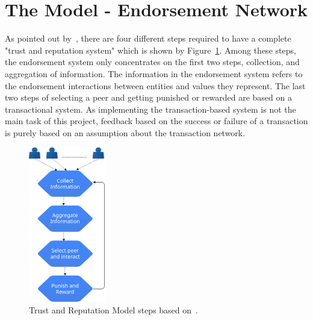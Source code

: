 \section{The Model - Endorsement Network}\label{sec:endorsementModel}
As pointed out by~\cite{marmol2009security}, there are four different steps
required to have a complete "trust and reputation system" which is shown by
Figure~\ref{fig:truststep}. Among these steps, the endorsement system only
concentrates on the first two steps, collection, and aggregation of
information. The information in the endorsement system refers to the
endorsement interactions between entities and values they represent. The last
two steps of selecting a peer and getting punished or rewarded are based on a
transactional system. As implementing the transaction-based system is not the
main task of this project, feedback based on the success or failure of a
transaction is purely based on an assumption about the transaction network.
\par 
\begin{figure}
	\begin{center}
		\includegraphics[width=0.3\textwidth]{Images/trustreputationsteps.eps}
		\caption{Trust and Reputation Model steps based
		on~\cite{marmol2009security}.}
		\label{fig:truststep}
	\end{center}
\end{figure}
